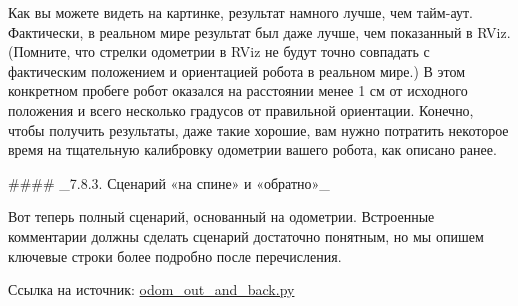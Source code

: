 Как вы можете видеть на картинке, результат намного лучше, чем тайм-аут. Фактически, в реальном мире результат был даже лучше, чем показанный в RViz. (Помните, что стрелки одометрии в RViz не будут точно совпадать с фактическим положением и ориентацией робота в реальном мире.) В этом конкретном пробеге робот оказался на расстоянии менее 1 см от исходного положения и всего несколько градусов от правильной ориентации. Конечно, чтобы получить результаты, даже такие хорошие, вам нужно потратить некоторое время на тщательную калибровку одометрии вашего робота, как описано ранее.

#### _7.8.3. Сценарий «на спине» и «обратно»_

Вот теперь полный сценарий, основанный на одометрии. Встроенные комментарии должны сделать сценарий достаточно понятным, но мы опишем ключевые строки более подробно после перечисления.

Ссылка на источник: \href{https://github.com/pirobot/rbx1/blob/indigo-devel/rbx1_nav/nodes/odom_out_and_back.py}{odom\_out\_and\_back.py}

